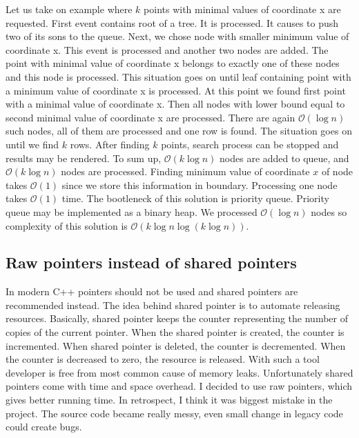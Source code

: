 \documentclass[10pt,a4paper]{article}
\newcommand{\Oh}{\mathcal{O}}
\begin{document}
Let us take on example where $k$ points with minimal values of coordinate x are requested. First event contains root of a tree. It is processed. It causes to push two of its sons to the queue. Next, we chose node with smaller minimum value of coordinate x. This event is processed and another two nodes are added. The point with minimal value of coordinate x belongs to exactly one of these nodes and this node is processed. This situation goes on until leaf containing point with a minimum value of coordinate x is processed. At this point we found first point with a minimal value of coordinate x. Then all nodes with lower bound equal to second minimal value of coordinate x are processed. There are again $\Oh(\log n)$ such nodes, all of them are processed and one row is found. The situation goes on until we find $k$ rows.  After finding $k$ points, search process can be stopped and results may be rendered. To sum up, $\Oh(k \log n)$ nodes are added to queue, and $\Oh(k \log n)$ nodes are processed. Finding minimum value of coordinate $x$ of node takes $\Oh(1)$ since we store this information in boundary. Processing one node takes $\Oh(1)$ time. The bootleneck of this solution is priority queue. Priority queue may be implemented as a binary heap. We processed $\Oh(\log n)$ nodes so complexity of this solution is $\Oh(k \log n \log(k \log n))$.

\subsection{Raw pointers instead of shared pointers}

In modern C++ pointers should not be used and shared pointers are recommended instead. The idea behind shared pointer is to automate releasing resources. Basically, shared pointer keeps the counter representing the number of copies of the current pointer. When the shared pointer is created, the counter is incremented. When shared pointer is deleted, the counter is decremented. When the counter is decreased to zero, the resource is released. With such a tool developer is free from most common cause of memory leaks. Unfortunately shared pointers come with time and space overhead. I decided to use raw pointers, which gives better running time. In retrospect, I think it was biggest mistake in the project. The source code became really messy, even small change in legacy code could create bugs.
\end{document}
